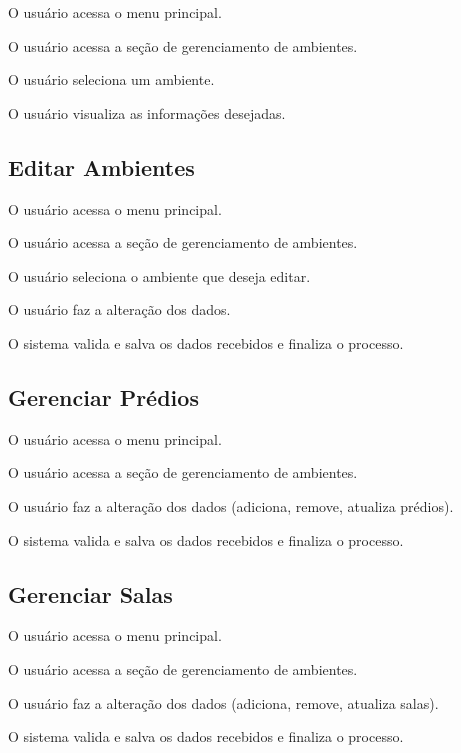 \documentclass[12pt,a4paper]{article}
\begin{document}
\begin{fluxo}
  \item O usuário acessa o menu principal.
  \item O usuário acessa a seção de gerenciamento de ambientes.
  \item O usuário seleciona um ambiente.
  \item O usuário visualiza as informações desejadas.
\end{fluxo}

\subsection{Editar Ambientes}

\begin{fluxo}
  \item O usuário acessa o menu principal.
  \item O usuário acessa a seção de gerenciamento de ambientes.
  \item O usuário seleciona o ambiente que deseja editar.
  \item O usuário faz a alteração dos dados.
  \item O sistema valida e salva os dados recebidos e finaliza o processo.
\end{fluxo}

\subsection{Gerenciar Prédios}

\begin{fluxo}
  \item O usuário acessa o menu principal.
  \item O usuário acessa a seção de gerenciamento de ambientes.
  \item O usuário faz a alteração dos dados (adiciona, remove, atualiza
        prédios).
  \item O sistema valida e salva os dados recebidos e finaliza o processo.
\end{fluxo}

\subsection{Gerenciar Salas}

\begin{fluxo}
  \item O usuário acessa o menu principal.
  \item O usuário acessa a seção de gerenciamento de ambientes.
  \item O usuário faz a alteração dos dados (adiciona, remove, atualiza salas).
  \item O sistema valida e salva os dados recebidos e finaliza o processo.
\end{fluxo}
\end{document}

